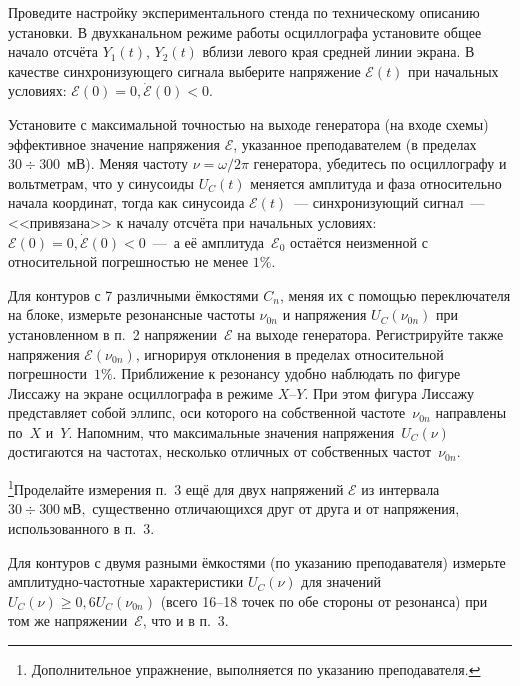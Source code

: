 \begin{lab:task}

\item Проведите настройку экспериментального стенда по техническому описанию установки.
В двухканальном режиме работы осциллографа установите общее начало отсчёта $Y_1(t)$, $Y_2(t)$ вблизи левого края
средней линии экрана. В качестве синхронизующего сигнала выберите напряжение
$\mathcal{E}(t)$ при начальных условиях: $\mathcal{E}(0)=0,
\dot{\mathcal{E}}(0)<0.$

    \item Установите с максимальной точностью на выходе генератора (на входе
схемы) эффективное значение напряжения $\mathcal{E}$, указанное преподавателем (в
пределах $30\div300$~мВ). Меняя частоту $\nu=\omega/2\pi$ генератора, убедитесь по
осциллографу и вольтметрам, что у синусоиды $U_C(t)$ меняется амплитуда и фаза
относительно начала координат, тогда как синусоида
$\mathcal{E}(t)$~--- синхронизующий сигнал~--- <<привязана>> к началу отсчёта
при начальных условиях: $\mathcal{E}(0)=0, \dot{\mathcal{E}}(0)<0$~---~а её
амплитуда~$\mathcal{E}_0$ остаётся неизменной с относительной погрешностью не
менее $1\%$. 

    \item Для контуров с 7 различными ёмкостями $C_n$, меняя их с помощью
переключателя на блоке, измерьте резонансные частоты $\nu_{0n}$ и напряжения
$U_C(\nu_{0n})$ при установленном в п.~2 напряжении~$\mathcal{E}$ на выходе
генератора. Регистрируйте также напряжения $\mathcal{E}(\nu_{0n})$, игнорируя
отклонения в пределах относительной погрешности~$1\%$. Приближение к резонансу
удобно наблюдать по фигуре Лиссажу на экране осциллографа в режиме $X$--$Y$.
При этом фигура Лиссажу представляет собой эллипс, оси которого на собственной
частоте~$\nu_{0n}$ направлены по~$X$ и~$Y$. 
Напомним, что максимальные значения напряжения~$U_C(\nu)$ достигаются на частотах, 
несколько отличных от собственных частот~$\nu_{0n}$.

    \item \footnote{Дополнительное упражнение, выполняется по указанию
        преподавателя.}Проделайте измерения п.~3 ещё
для двух напряжений $\mathcal{E}$ из интервала $30\div 300~мВ,$ существенно
отличающихся друг от друга и от напряжения, использованного в п.~3.

    \item Для контуров с двумя разными ёмкостями (по указанию преподавателя)
измерьте амплитудно-частотные характеристики $U_C(\nu)$ для значений
$U_C(\nu) \ge 0,6 U_C(\nu_{0n})$ (всего 16--18 точек по обе стороны от резонанса)
при том же напряжении~$\mathcal{E}$, что и в п.~3.


\end{lab:task}
